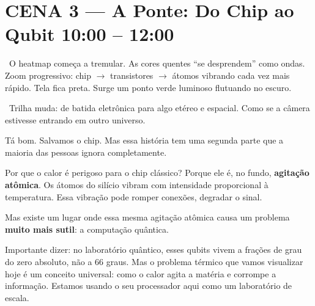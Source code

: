 \section{CENA 3 --- A Ponte: Do Chip ao Qubit \hfill \normalfont\small\color{corTempo}10:00 -- 12:00}


\begin{visual}
\faFilm\ O heatmap começa a tremular. As cores quentes ``se desprendem'' como ondas.
Zoom progressivo: chip $\to$ transistores $\to$ átomos vibrando cada vez mais rápido.
Tela fica preta. Surge um ponto verde luminoso flutuando no escuro.
\end{visual}

\begin{audiocue}
\faMusic\ Trilha muda: de batida eletrônica para algo etéreo e espacial.
Como se a câmera estivesse entrando em outro universo.
\end{audiocue}

\begin{fala}
Tá bom. Salvamos o chip. Mas essa história tem uma segunda parte
que a maioria das pessoas ignora completamente.
\end{fala}


\begin{fala}
Por que o calor é perigoso para o chip clássico? Porque ele é, no fundo,
\textbf{agitação atômica}. Os átomos do silício vibram com intensidade
proporcional à temperatura. Essa vibração pode romper conexões, degradar o sinal.
\end{fala}

\begin{fala}
Mas existe um lugar onde essa mesma agitação atômica causa um problema
\textbf{muito mais sutil}: a computação quântica.
\end{fala}

\begin{fala}
Importante dizer: no laboratório quântico, esses qubits vivem a frações de 
grau do zero absoluto, não a 66 graus. Mas o problema térmico que vamos 
visualizar hoje é um conceito universal: como o calor agita a matéria e 
corrompe a informação. Estamos usando o seu processador aqui como um 
laboratório de escala.
\end{fala}


